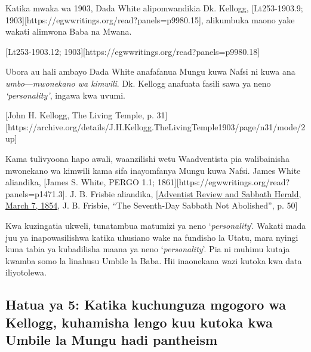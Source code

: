 Katika mwaka wa 1903, Dada White alipomwandikia Dk. Kellogg, [Lt253-1903.9; 1903][https://egwwritings.org/read?panels=p9980.15], alikumbuka maono yake wakati alimwona Baba na Mwana.

[Lt253-1903.12; 1903][https://egwwritings.org/read?panels=p9980.18]

Ubora au hali ambayo Dada White anafafanua Mungu kuwa Nafsi ni kuwa ana \textit{umbo}—\textit{mwonekano wa kimwili}. Dk. Kellogg anafuata fasili sawa ya neno \textit{‘personality’}, ingawa kwa uvumi.

[John H. Kellogg, The Living Temple, p. 31][https://archive.org/details/J.H.Kellogg.TheLivingTemple1903/page/n31/mode/2up]

Kama tulivyoona hapo awali, waanzilishi wetu Waadventista pia walibainisha mwonekano wa kimwili kama sifa inayomfanya Mungu kuwa Nafsi. James White aliandika, [James S. White, PERGO 1.1; 1861][https://egwwritings.org/read?panels=p1471.3]. J. B. Frisbie aliandika, [\href{https://documents.adventistarchives.org/Periodicals/RH/RH18540307-V05-07.pdf}{Adventist Review and Sabbath Herald, March 7, 1854}, J. B. Frisbie, “The Seventh-Day Sabbath Not Abolished”, p. 50]

Kwa kuzingatia ukweli, tunatambua matumizi ya neno ‘\textit{personality}’. Wakati mada juu ya  inapowasilishwa katika uhusiano wake na fundisho la Utatu, mara nyingi kuna tabia ya kubadilisha maana ya neno ‘\textit{personality}’. Pia ni muhimu kutaja kwamba somo la  linahusu Umbile la Baba. Hii inaonekana wazi kutoka kwa data iliyotolewa.

\subsection*{Hatua ya 5: Katika kuchunguza mgogoro wa Kellogg, kuhamisha lengo kuu kutoka kwa Umbile la Mungu hadi pantheism}

